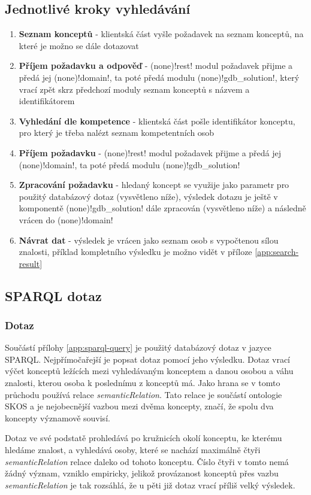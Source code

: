 \subsection{Jednotlivé kroky vyhledávání}
\begin{enumerate}
    \item \textbf{Seznam konceptů} - klientská část vyšle požadavek na seznam konceptů, na které je možno se dále dotazovat
    \item \textbf{Příjem požadavku a odpověď} - \ctulst(none)!rest! modul požadavek přijme a předá jej \ctulst(none)!domain!, ta poté předá modulu \ctulst(none)!gdb_solution!, který vrací zpět skrz předchozí moduly seznam konceptů s názvem a identifikátorem
    \item \textbf{Vyhledání dle kompetence} - klientská část pošle identifikátor konceptu, pro který je třeba nalézt seznam kompetentních osob
    \item \textbf{Příjem požadavku} - \ctulst(none)!rest! modul požadavek přijme a předá jej \ctulst(none)!domain!, ta poté předá modulu \ctulst(none)!gdb_solution!
    \item \textbf{Zpracování požadavku} - hledaný koncept se využije jako parametr pro použitý databázový dotaz (vysvětleno níže), výsledek dotazu je ještě v komponentě \ctulst(none)!gdb_solution! dále zpracován (vysvětleno níže) a následně vrácen do \ctulst(none)!domain!
    \item \textbf{Návrat dat} - výsledek je vrácen jako seznam osob s vypočtenou sílou znalosti, příklad kompletního výsledku je možno vidět v příloze \ref{app:search-result}
\end{enumerate}

\subsection{SPARQL dotaz}
\subsubsection{Dotaz}
Součástí přílohy \ref{app:sparql-query} je použitý databázový dotaz v jazyce SPARQL. Nejpřímočařejší je popsat dotaz pomocí jeho výsledku. Dotaz vrací výčet konceptů ležících mezi vyhledávaným konceptem a danou osobou a váhu znalosti, kterou osoba k poslednímu z konceptů má. Jako hrana se v tomto průchodu používá relace \textit{semanticRelation}. Tato relace je součástí ontologie SKOS a je nejobecnější vazbou mezi dvěma koncepty, značí, že spolu dva koncepty významově souvisí.\par
Dotaz ve své podstatě prohledává po kružnicích okolí konceptu, ke kterému hledáme znalost, a vyhledává osoby, které se nachází maximálně čtyři \textit{semanticRelation} relace daleko od tohoto konceptu. Číslo čtyři v tomto nemá žádný význam, vzniklo empiricky, jelikož provázanost konceptů přes vazbu \textit{semanticRelation} je tak rozsáhlá, že u pěti již dotaz vrací příliš velký výsledek.
